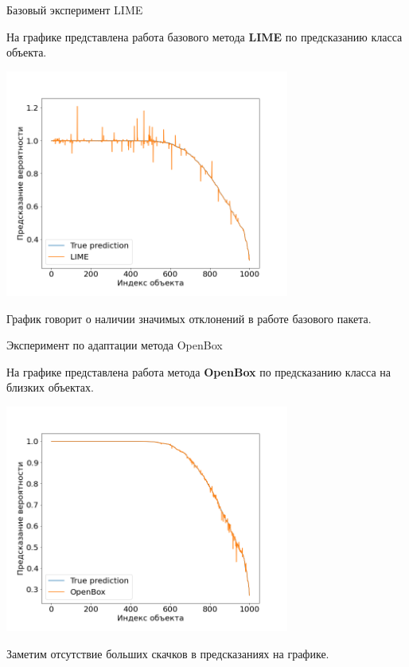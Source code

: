 \documentclass{beamer}
\begin{document}
\begin{frame}{Базовый эксперимент LIME}

 На графике представлена работа базового метода \textbf{LIME} по предсказанию класса объекта.

 \includegraphics[width=0.70\textwidth]{../fig/True_Lime.png}


График говорит о наличии значимых отклонений в работе базового пакета.

\end{frame}
\begin{frame}{Эксперимент по адаптации метода OpenBox}

 На графике представлена работа метода \textbf{OpenBox} по предсказанию класса на близких объектах.
 
 \includegraphics[width=0.70\textwidth]{../fig/True_OpenBox.png}


Заметим отсутствие больших скачков в предсказаниях на графике.

\end{frame}
\end{document}
